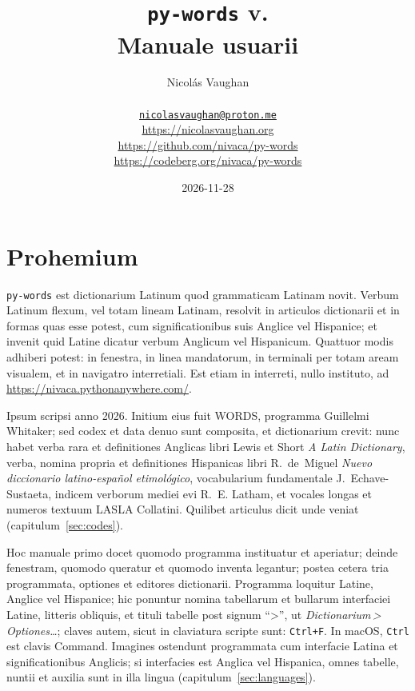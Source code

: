 \documentclass[12pt,
              article,
              oneside
              ]{memoir}
\title{\bfseries%
  \texttt{py-words} v.\version{} \\
  Manuale usuarii}
\author{%
  Nicolás Vaughan\\
  \begin{minipage}[t]{0.8\linewidth}
    \centering\small%
    \href{mailto:nicolasvaughan@proton.me}{\texttt{nicolasvaughan@proton.me}}\\
    \url{https://nicolasvaughan.org}\\
    \url{https://github.com/nivaca/py-words}\\
    \url{https://codeberg.org/nivaca/py-words}\\
  \end{minipage}}
\date{2026-11-28}
\newcommand*{\menu}[1]{\textit{#1}}
\newcommand*{\then}{\,>\,}
\newcommand*{\key}[1]{\texttt{#1}}
\begin{document}
\maketitle

\tableofcontents*

\section{Prohemium}
\noindent
\texttt{py-words} est dictionarium Latinum quod grammaticam Latinam novit.
Verbum Latinum flexum, vel totam lineam Latinam, resolvit in articulos
dictionarii et in formas quas esse potest, cum significationibus suis
Anglice vel Hispanice; et invenit quid Latine dicatur verbum Anglicum vel
Hispanicum. Quattuor modis adhiberi potest: in fenestra, in linea
mandatorum, in terminali per totam aream visualem, et in navigatro
interretiali. Est etiam in interreti, nullo instituto, ad
\url{https://nivaca.pythonanywhere.com/}.

%
Ipsum scripsi anno 2026. Initium eius fuit WORDS, programma Guillelmi
Whitaker; sed codex et data denuo sunt composita, et dictionarium crevit:
nunc habet verba rara et definitiones Anglicas libri Lewis et Short
\textit{A Latin Dictionary}, verba, nomina propria et definitiones
Hispanicas libri R.~de~Miguel \textit{Nuevo diccionario latino-español
etimológico}, vocabularium fundamentale J.~Echave-Sustaeta, indicem
verborum mediei evi R.~E. Latham, et vocales longas et numeros textuum
LASLA Collatini. Quilibet
articulus dicit unde veniat (capitulum~\ref{sec:codes}).

%
Hoc manuale primo docet quomodo programma instituatur et aperiatur;
deinde fenestram, quomodo queratur et quomodo inventa legantur; postea
cetera tria programmata, optiones et editores dictionarii. Programma
loquitur Latine, Anglice vel Hispanice; hic ponuntur nomina tabellarum
et bullarum interfaciei Latine, litteris obliquis, et tituli tabelle post
signum \enquote{>}, ut \menu{Dictionarium\then Optiones\ldots}; claves
autem, sicut in claviatura scripte sunt: \key{Ctrl+F}. In macOS,
\key{Ctrl} est clavis Command. Imagines ostendunt programmata cum
interfacie Latina et significationibus Anglicis; si interfacies est
Anglica vel Hispanica, omnes tabelle, nuntii et auxilia sunt in illa
lingua (capitulum~\ref{sec:languages}).
\end{document}
